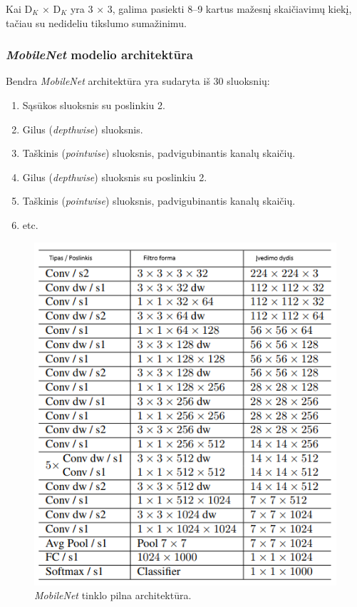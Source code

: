 \documentclass{VUMIFInfKursinis}
\begin{document}
Kai D$_{K}$ × D$_{K}$ yra 3 × 3, galima pasiekti 8–9 kartus mažesnį skaičiavimų kiekį, tačiau su nedideliu tikslumo sumažinimu.

\newpage

\subsubsection{\textit{MobileNet} modelio architektūra}

Bendra \textit{MobileNet} architektūra yra sudaryta iš 30 sluoksnių\cite{10}:

\begin{enumerate}
  \item Sąsūkos sluoksnis su poslinkiu 2.
  \item Gilus (\textit{depthwise}) sluoksnis.
  \item Taškinis (\textit{pointwise}) sluoksnis, padvigubinantis kanalų skaičių.
  \item Gilus (\textit{depthwise}) sluoksnis su poslinkiu 2.
  \item Taškinis (\textit{pointwise}) sluoksnis, padvigubinantis kanalų skaičių.
  \item etc.
\end{enumerate}

\begin{figure}[h!]
\centering
  \includegraphics[scale=0.7]{img/mobilenet_table.PNG}
  \caption{\textit{MobileNet} tinklo pilna architektūra.}
  \label{fig:pointwise_convolution}
\end{figure}
\end{document}
